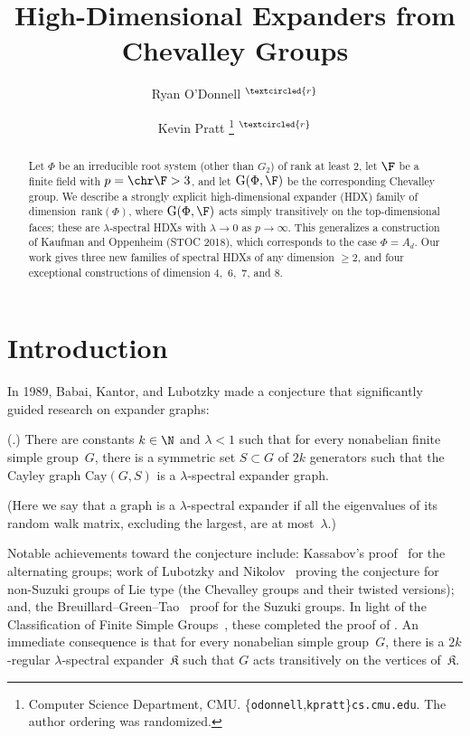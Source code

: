 \documentclass[11pt]{article}
\title{High-Dimensional Expanders from Chevalley Groups}
\author{Ryan O'Donnell\footnotemark[1]${~}^{\tiny{\textcircled{r}}}$ \and Kevin Pratt%
\thanks{Computer Science Department, CMU. \{\texttt{odonnell},\texttt{kpratt}\}\texttt{cs.cmu.edu}.
\quad {\tiny \textcircled{r}} The author ordering was randomized.}${~}^{\tiny{\textcircled{r}}}$}
\date{}
\newcommand{\Ggeneric}[2]{\mathrm{G}(#1,#2)}
\newcommand{\rank}{{\mathrm{rank}}}
\newcommand{\Cay}{\mathrm{Cay}}
\newcommand{\complex}{\mathfrak{K}}
\begin{document}
\maketitle

\begin{abstract}
Let $\Phi$ be an irreducible root system (other than $G_2$) of rank at least $2$, let $\F$ be a finite field with $p = \chr \F > 3$, and let $\Ggeneric{\Phi}{\F}$ be the corresponding Chevalley group.
We describe a strongly explicit high-dimensional expander (HDX) family of dimension~$\rank(\Phi)$, where $\Ggeneric{\Phi}{\F}$ acts simply transitively on the top-dimensional faces; these are $\lambda$-spectral HDXs with $\lambda \to 0$ as $p \to \infty$.
This generalizes a construction of Kaufman and Oppenheim (STOC 2018), which corresponds to the case $\Phi = A_d$.
Our work gives three new families of spectral HDXs of any dimension $\ge 2$, and four exceptional constructions of dimension $4$,~$6$,~$7$, and $8$.
\end{abstract}

\section{Introduction}
In 1989, Babai, Kantor, and Lubotzky made a conjecture that significantly guided research on expander graphs:
\begin{conjecture}      \label{conj:1}
    (\cite{BKL89}.) There are constants $k \in \N$ and $\lambda < 1$ such that for every nonabelian finite simple group~$G$, there is a symmetric set $S \subset G$ of $2k$ generators such that the Cayley graph $\Cay(G,S)$ is a $\lambda$-spectral expander graph.
\end{conjecture}
\noindent (Here we say that a graph is a $\lambda$-spectral expander if all the eigenvalues of its random walk matrix, excluding the largest, are at most~$\lambda$.)

Notable achievements toward the conjecture include: Kassabov's proof~\cite{Kas07} for the alternating groups; work of Lubotzky and Nikolov~\cite{KLN06} proving the conjecture for non-Suzuki groups of Lie type (the Chevalley groups and their twisted versions); and, the Breuillard--Green--Tao~\cite{BGT11} proof for the Suzuki groups.
In light of the Classification of Finite Simple Groups~\cite{Asc04}, these completed the proof of .
An immediate consequence is that for every nonabelian simple group~$G$, there is a $2k$-regular $\lambda$-spectral expander~$\complex$ such that $G$ acts transitively on the vertices of~$\complex$.
\end{document}
